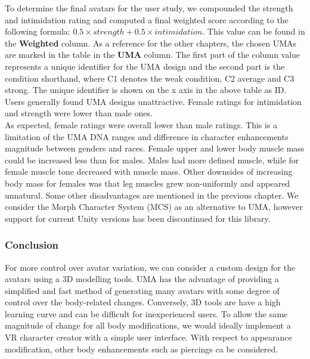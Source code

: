 To determine the final avatars for the user study, we compounded the strength and intimidation rating and computed a final weighted score according to the following formula: $ 0.5 \times strength + 0.5  \times intimidation $. This value can be found in the \textbf{Weighted} column. 
As a reference for the other chapters, the chosen UMAs are marked in the table in the \textbf{UMA} column. The first part of the column value represents a unique identifier for the UMA design and the second part is the condition shorthand, where C1 denotes the weak condition, C2 average and C3 strong. The unique identifier is shown on the x axis in the above table as ID.
Users generally found UMA designs unattractive. Female ratings for intimidation and strength were lower than male ones.
\\
As expected, female ratings were overall lower than male ratings. This is a limitation of the UMA DNA ranges and difference in character enhancements magnitude between  genders and races. Female upper and lower body muscle mass could be increased less than for males. Males had more defined muscle, while for female muscle tone decreased with muscle mass. Other downsides of increasing body mass for females was that leg muscles grew non-uniformly and appeared unnatural. Some other disadvantages are mentioned in the previous chapter. We consider the Morph Character System (MCS) as an alternative to UMA, however support for current Unity versions has been discontinued for this library.

\subsubsection{Conclusion}
For more control over avatar variation, we can consider a custom design for the avatars using a 3D modelling tools.  UMA has the advantage of providing a simplified and fast method of generating many avatars with some degree of control over the body-related changes. Conversely, 3D tools are have a high learning curve and can be difficult for inexperienced users. To allow the same magnitude of change for all body modifications, we would ideally implement a VR character creator with a simple user interface. With respect to appearance modification, other body enhancements such as piercings ca be considered.

